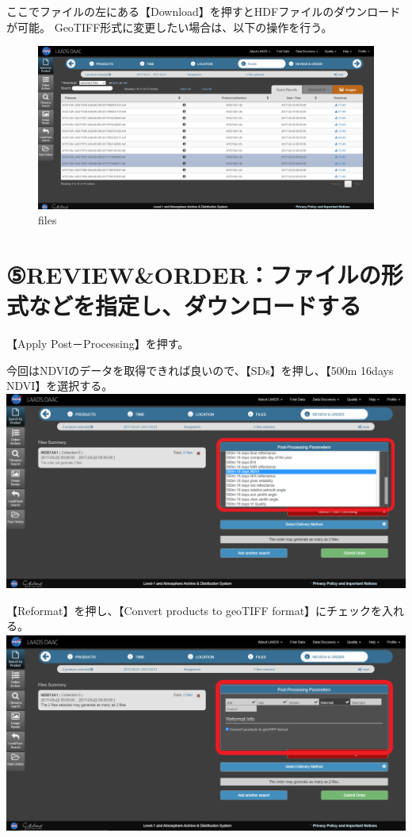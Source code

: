 \documentclass[
]{book}
\begin{document}
ここでファイルの左にある【Download】を押すとHDFファイルのダウンロードが可能。
GeoTIFF形式に変更したい場合は、以下の操作を行う。

\begin{figure}
\centering
\includegraphics{images/LD-5.png}
\caption{files}
\end{figure}

\hypertarget{revieworderux30d5ux30a1ux30a4ux30ebux306eux5f62ux5f0fux306aux3069ux3092ux6307ux5b9aux3057ux30c0ux30a6ux30f3ux30edux30fcux30c9ux3059ux308b}{%
\section{⑤REVIEW\&ORDER：ファイルの形式などを指定し、ダウンロードする}\label{revieworderux30d5ux30a1ux30a4ux30ebux306eux5f62ux5f0fux306aux3069ux3092ux6307ux5b9aux3057ux30c0ux30a6ux30f3ux30edux30fcux30c9ux3059ux308b}}

【Apply Post－Processing】を押す。

今回はNDVIのデータを取得できれば良いので、【SDs】を押し、【500m 16days NDVI】を選択する。
\includegraphics{images/LD-6.png}

【Reformat】を押し、【Convert products to geoTIFF format】にチェックを入れる。
\includegraphics{images/LD-7.png}
\end{document}
